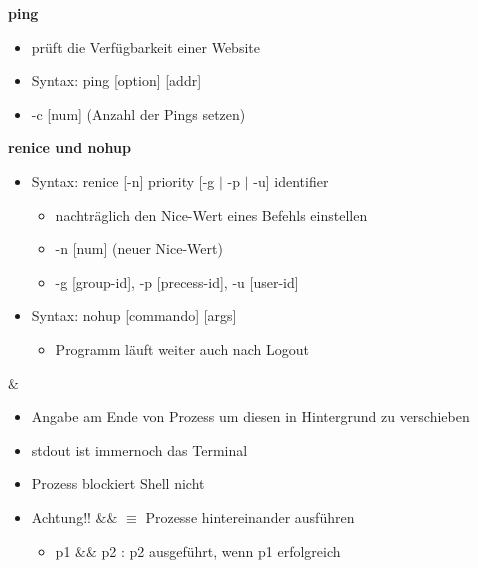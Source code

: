 \documentclass[12pt,utf8, 10pt]{article}
\begin{document}
\textbf{ping}
\begin{itemize}
	\item prüft die Verfügbarkeit einer Website
	\item Syntax: ping [option] [addr] 
	\item -c [num] (Anzahl der Pings setzen)
\end{itemize}

\textbf{renice und nohup}
\begin{itemize}
	\item Syntax: renice [-n] priority [-g $\mid$ -p $\mid$ -u] identifier
	\begin{itemize}
		\item nachträglich den Nice-Wert eines Befehls einstellen
		\item -n [num] (neuer Nice-Wert)
		\item -g [group-id], -p [precess-id], -u [user-id]
	\end{itemize}
	\item Syntax: nohup [commando] [args]
	\begin{itemize}
		\item Programm läuft weiter auch nach Logout
	\end{itemize}
\end{itemize}

\textbf{$\&$}
\begin{itemize}
	\item Angabe am Ende von Prozess um diesen in Hintergrund zu verschieben
	\item stdout ist immernoch das Terminal
	\item Prozess blockiert Shell nicht
	\item Achtung!! $\&\&$ $\equiv$ Prozesse hintereinander ausführen
	\begin{itemize}
		\item p1 $\&\&$ p2 : p2 ausgeführt, wenn p1 erfolgreich
	\end{itemize}
\end{itemize}
\end{document}
